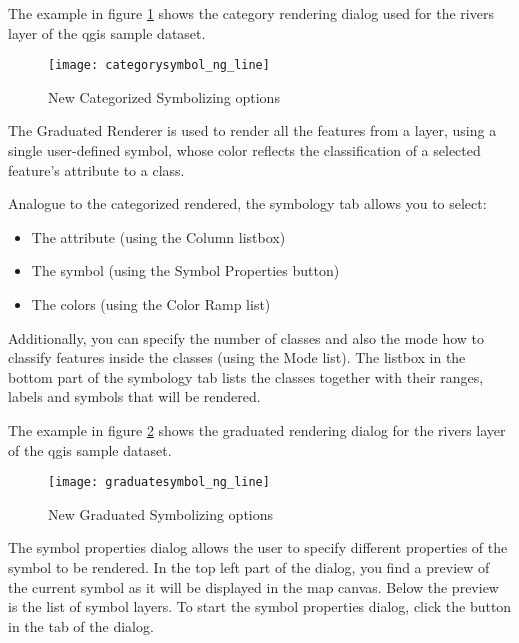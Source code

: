 The example in figure \ref{fig:catsymNG} shows the category rendering dialog 
used for the rivers layer of the qgis sample dataset.

\begin{figure}[ht]
   \begin{center}
   \caption{New Categorized Symbolizing options \nixcaption}\label{fig:catsymNG}\smallskip
   \texttt{[image: categorysymbol\_ng\_line]}
\end{center}
\end{figure}


The Graduated Renderer is used to render all the features from a layer, using 
a single user-defined symbol, whose color reflects the classification of a selected 
feature's attribute to a class.

Analogue to the categorized rendered, the symbology tab allows you to select:

\begin{itemize}
\item The attribute (using the Column listbox)
\item The symbol (using the Symbol Properties button)
\item The colors (using the Color Ramp list)
\end{itemize}

Additionally, you can specify the number of classes and also the mode how to 
classify features inside the classes (using the Mode list). The listbox in the 
bottom part of the symbology tab lists the classes together with their ranges, 
labels and symbols that will be rendered.

The example in figure \ref{fig:gradsymNG} shows the graduated rendering dialog 
for the rivers layer of the qgis sample dataset.

\begin{figure}[ht]
   \begin{center}
   \caption{New Graduated Symbolizing options \nixcaption}\label{fig:gradsymNG}\smallskip
   \texttt{[image: graduatesymbol\_ng\_line]}
\end{center}
\end{figure}


The symbol properties dialog allows the user to specify different properties of 
the symbol to be rendered. In the top left part of the dialog, you find a preview 
of the current symbol as it will be displayed in the map canvas. Below the preview 
is the list of symbol layers. To start the symbol properties dialog, click the 
 button in the  tab of the
 dialog. 

